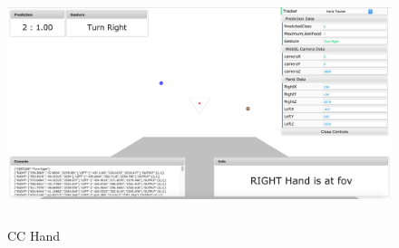 \begin{figure}
	[h] \centering 
	\includegraphics[height=7cm]{figures/content/cc-hand.jpg} \caption{CC Hand} \label{fg:cc:hand} 
\end{figure}